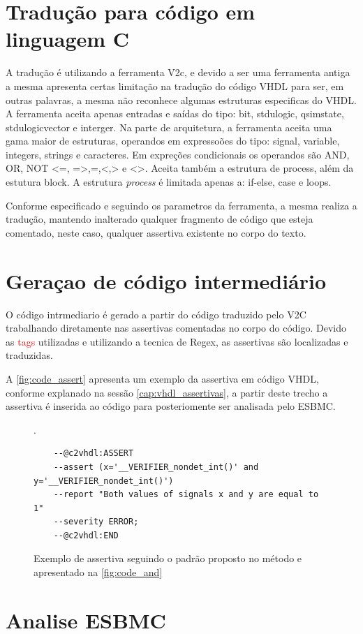 \section{\label{cap:traducao}Tradução para código em linguagem C}
A tradução é utilizando a ferramenta V2c, e devido a ser uma ferramenta antiga a mesma apresenta certas limitação na tradução do código VHDL para ser, em outras palavras, a mesma não reconhece algumas estruturas especificas do VHDL. A ferramenta aceita apenas entradas e saídas do tipo: bit, std\underline{\space}ulogic, qsim\underline{\space}state, std\underline{\space}ulogic\underline{\space}vector e interger. Na parte de arquitetura, a ferramenta aceita uma gama maior de estruturas, operandos em expressoões do tipo: signal, variable, integers, strings e caracteres. Em expreções condicionais os operandos são AND, OR, NOT <=, =>,=,<,> e <>. Aceita também a estrutura de process, além da estutura block. A estrutura \textit{process} é limitada apenas a: if-else, case e  loops.

\par
Conforme especificado e seguindo os parametros da ferramenta, a mesma realiza a tradução, mantendo inalterado qualquer fragmento de código que esteja comentado, neste caso, qualquer assertiva existente no corpo do texto.
\section{Geraçao de código intermediário} 
\par
O código intrmediario é gerado a partir do código traduzido pelo V2C trabalhando diretamente nas assertivas comentadas no corpo do código. Devido as \textcolor{red}{tags} utilizadas e utilizando a tecnica de Regex, as assertivas são localizadas e traduzidas.

\par
A \autoref{fig:code_assert} apresenta um exemplo da assertiva em código VHDL, conforme explanado na sessão \autoref{cap:vhdl_assertivas}, a partir deste trecho a assertiva é inserida ao código para posteriomente ser analisada pelo ESBMC.

\begin{figure}[thp]
\caption{\label{fig:code_assert} Exemplo de assertiva seguindo o padrão proposto no método e apresentado na \autoref{fig:code_and}}. 
	\begin{center}
    \begin{minipage}{0.7\textwidth}
    \begin{lstlisting}       	
    --@c2vhdl:ASSERT
    --assert (x='__VERIFIER_nondet_int()' and y='__VERIFIER_nondet_int()')
    --report "Both values of signals x and y are equal to 1"
    --severity ERROR;
    --@c2vhdl:END
\end{lstlisting}
    \end{minipage}
	\end{center}
\end{figure}

\section{Analise ESBMC}

